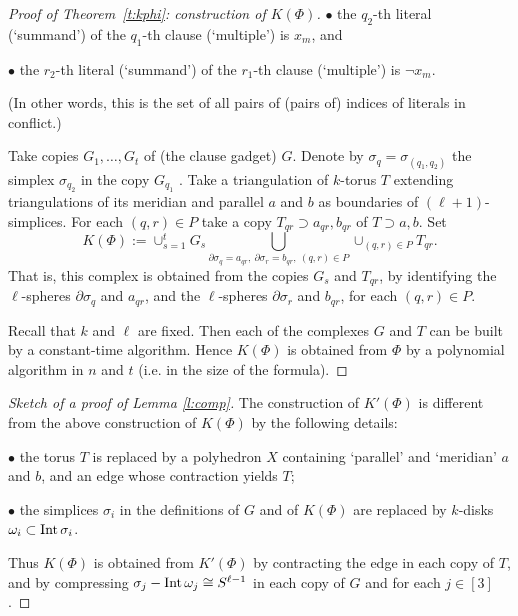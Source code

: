 \documentclass[runningheads]{llncs}
\theoremstyle{remark}
\theoremstyle{definition}
\def\Int{\mathop{\fam0 Int}}
\begin{document}
{\begin{proof}[Proof of Theorem~\ref{t:kphi}: construction of $K(\Phi)$]
$\bullet$ the $q_2$-th literal (`summand') of the $q_1$-th clause (`multiple') is $x_m$,  and

$\bullet$ the $r_2$-th literal (`summand') of the $r_1$-th clause (`multiple') is $\neg x_m$.

(In other words, this is the set of all pairs of (pairs of) indices of literals in conflict.)

Take copies $G_1,\ldots,G_t$ of (the clause gadget) $G$.
Denote by $\sigma_q=\sigma_{(q_1,q_2)}$ the simplex $\sigma_{q_2}$ in the copy $G_{q_1}$ .
Take a triangulation of $k$-torus $T$ extending triangulations of its meridian and parallel $a$ and $b$ as boundaries of $(\ell+1)$-simplices.
For each $(q,r)\in P$ take a copy $T_{qr}\supset a_{qr},b_{qr}$ of $T\supset a,b$.
Set
$$K(\Phi):=\cup_{s=1}^t G_s
\bigcup\limits_{\partial\sigma_q=a_{qr},\ \partial\sigma_r=b_{qr}, \ (q,r)\in P}
\cup_{(q,r)\in P} T_{qr}.$$
That is, this complex is obtained from the copies $G_s$ and $T_{qr}$, by identifying the $\ell$-spheres $\partial\sigma_q$ and   $a_{qr}$, and the $\ell$-spheres $\partial\sigma_r$ and $b_{qr}$, for each $(q,r)\in P$.

Recall that $k$ and $\ell$ are fixed.
Then each of the complexes $G$ and $T$ can be built by a constant-time algorithm.
Hence $K(\Phi)$ is obtained from $\Phi$ by a polynomial algorithm in $n$ and $t$ (i.e. in the size of the formula).
\end{proof}

\begin{proof}[Sketch of a proof of Lemma \ref{l:comp}]
The construction of $K'(\Phi)$ \cite[\S4.2, \S5.2]{MaTaWa11} is different from the above construction of $K(\Phi)$
by the following details:

$\bullet$ the torus $T$ is replaced by a polyhedron
$X$ containing `parallel' and `meridian' $a$ and $b$, and an edge whose contraction yields $T$;

$\bullet$ the simplices $\sigma_i$ in the definitions of $G$ and of $K(\Phi)$ are replaced by $k$-disks $\omega_i\subset\Int\sigma_i$.

Thus $K(\Phi)$ is obtained from $K'(\Phi)$ by contracting the edge in each copy of $T$, and by compressing $\sigma_j-\Int\omega_j\cong S^{\ell-1}$ in each copy of $G$ and for each $j\in[3]$.
\end{proof}

}
\end{document}
